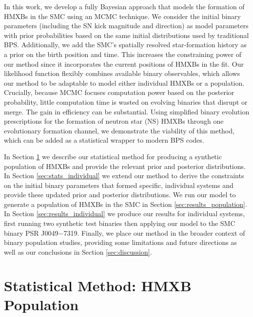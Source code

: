 \documentclass[usenatbib]{mnras}
\begin{document}
In this work, we develop a fully Bayesian approach that models the formation of HMXBs in the SMC using an MCMC technique. We consider the initial binary parameters (including the SN kick magnitude and direction) as model parameters with prior probabilities based on the same initial distributions used by traditional BPS. Additionally, we add the SMC's spatially resolved star-formation history as a prior on the birth position and time. This increases the constraining power of our method since it incorporates the current positions of HMXBs in the fit. Our likelihood function flexibly combines available binary observables, which allows our method to be adaptable to model either individual HMXBs or a population. Crucially, because MCMC focuses computation power based on the posterior probability, little computation time is wasted on evolving binaries that disrupt or merge. The gain in efficiency can be substantial. Using simplified binary evolution prescriptions for the formation of neutron star (NS) HMXBs through one evolutionary formation channel, we demonstrate the viability of this method, which can be added as a statistical wrapper to modern BPS codes.


In Section \ref{sec:stats_population} we describe our statistical method for producing a synthetic population of HMXBs and provide the relevant prior and posterior distributions. In Section \ref{sec:stats_individual} we extend our method to derive the constraints on the initial binary parameters that formed specific, individual systems and provide these updated prior and posterior distributions. We run our model to generate a population of HMXBs in the SMC in Section \ref{sec:results_population}. In Section \ref{sec:results_individual} we produce our results for individual systems, first running two synthetic test binaries then applying our model to the SMC binary PSR J0049$-$7319. Finally, we place our method in the broader context of binary population studies, providing some limitations and future directions as well as our conclusions in Section \ref{sec:discussion}.








\section{Statistical Method: HMXB Population} \label{sec:stats_population}
\end{document}

